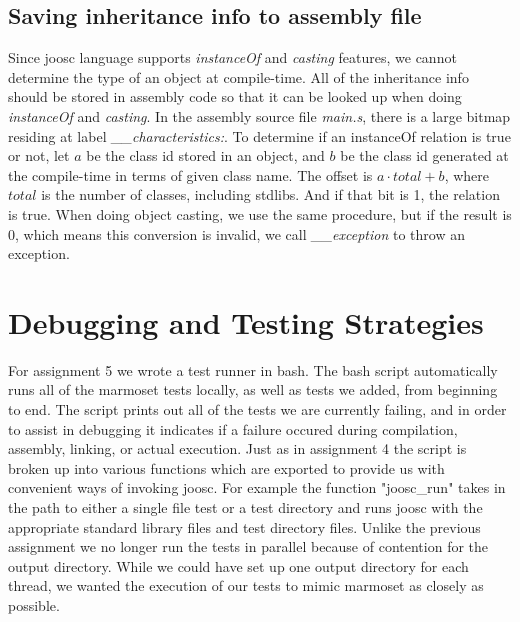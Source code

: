 \documentclass[12pt,letterpaper]{article}
\begin{document}
\subsection{Saving inheritance info to assembly file}
Since joosc language supports \emph{instanceOf} and \emph{casting} features, we cannot determine the type of an object at compile-time.
All of the inheritance info should be stored in assembly code so that it can be looked up when doing \emph{instanceOf} and \emph{casting}.
In the assembly source file \emph{main.s}, there is a large bitmap residing at label \emph{\_\_characteristics:}.
To determine if an instanceOf relation is true or not, let $a$ be the class id stored in an object, and $b$ be the class id generated at the compile-time in terms of given class name.
The offset is $a \cdot total + b$, where $total$ is the number of classes, including stdlibs.
And if that bit is 1, the relation is true.
When doing object casting, we use the same procedure, but if the result is 0, which means this conversion is invalid, we call \emph{\_\_exception} to throw an exception.

\section{Debugging and Testing Strategies}
For assignment 5 we wrote a test runner in bash.
The bash script automatically runs all of the marmoset tests locally, as well as tests we added, from beginning to end.
The script prints out all of the tests we are currently failing, and in order to assist in debugging it indicates if a failure occured during compilation, assembly, linking, or actual execution.
Just as in assignment 4 the script is broken up into various functions which are exported to provide us with convenient ways of invoking joosc.
For example the function "joosc\_run" takes in the path to either a single file test or a test directory and runs joosc with the appropriate standard library files and test directory files.
Unlike the previous assignment we no longer run the tests in parallel because of contention for the output directory.
While we could have set up one output directory for each thread, we wanted the execution of our tests to mimic marmoset as closely as possible.
\end{document}
